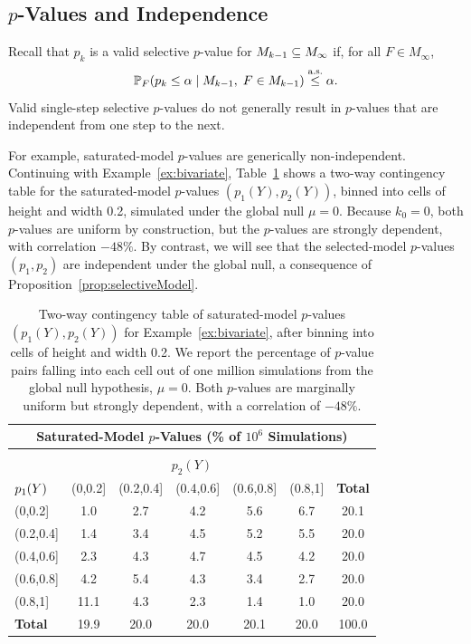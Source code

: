 \documentclass{article}
\begin{document}
\subsection{$p$-Values and Independence}\label{sec:pValsIndep}

Recall that $p_k$ is a valid selective $p$-value for $M_{k-1}\subseteq M_\infty$ if, for all $F\in M_\infty$,
\[
\mathbb{P}_F(p_k \leq \alpha \mid M_{k-1},\; F\in M_{k-1}) \overset{\textrm{a.s.}}{\leq} \alpha.
\]
Valid single-step selective $p$-values do not generally result in $p$-values that are independent from one step to the next. 

For example, saturated-model $p$-values are generically non-independent. Continuing with Example~\ref{ex:bivariate}, Table~\ref{tab:bv_twoWayTable} shows a two-way contingency table for the saturated-model $p$-values $(p_1(Y), p_2(Y))$, binned into cells of height and width 0.2, simulated under the global null $\mu=0$. Because $k_0=0$, both $p$-values are uniform by construction, but the $p$-values are strongly dependent, with correlation $-48\%$. By contrast, we will see that the selected-model $p$-values $(p_1,p_2)$ are independent under the global null, a consequence of Proposition~\ref{prop:selectiveModel}.

\begin{table}[ht]
  \centering
  \begin{tabular}{l|ccccc|c}
    \multicolumn{7}{c}{Saturated-Model $p$-Values 
      (\% of $10^6$ Simulations)}\\[7pt]
    \hline
    \multicolumn{7}{c}{}\\[-1.5ex]
    \multicolumn{7}{c}{$p_2(Y)$}\\[5pt]
    ${\large p_1(Y)}$ & (0,0.2] & (0.2,0.4] & (0.4,0.6] & (0.6,0.8] & (0.8,1] & \textbf{Total} \\ 
    \hline
    (0,0.2] & 1.0 & 2.7 & 4.2 & 5.6 & 6.7 & 20.1 \\ 
    (0.2,0.4] & 1.4 & 3.4 & 4.5 & 5.2 & 5.5 & 20.0 \\ 
    (0.4,0.6] & 2.3 & 4.3 & 4.7 & 4.5 & 4.2 & 20.0 \\ 
    (0.6,0.8] & 4.2 & 5.4 & 4.3 & 3.4 & 2.7 & 20.0 \\ 
    (0.8,1] & 11.1 & 4.3 & 2.3 & 1.4 & 1.0 & 20.0 \\ 
    \hline
    \textbf{Total} & 19.9 & 20.0 & 20.0 & 20.1 & 20.0 & 100.0 \\ 
    \hline
  \end{tabular}
  \caption{Two-way contingency table of saturated-model $p$-values $(p_1(Y), p_2(Y))$ for Example~\ref{ex:bivariate}, after binning into cells of height and width 0.2. We report the percentage of $p$-value pairs falling into each cell out of one million simulations from the global null hypothesis, $\mu=0$. Both $p$-values are marginally uniform but strongly dependent, with a correlation of $-48\%$.}
\label{tab:bv_twoWayTable}
\end{table}
\end{document}
